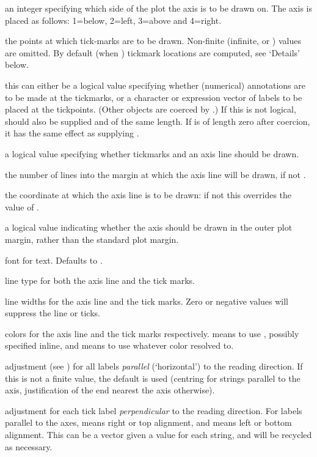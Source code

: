 \begin{Arguments}
\begin{ldescription}
\item[\code{side}] an integer specifying which side of the plot the axis is
to be drawn on.  The axis is placed as follows: 1=below,
2=left, 3=above and 4=right.
\item[\code{at}] the points at which tick-marks are to be drawn.  Non-finite
(infinite,  or ) values are omitted.  By default
(when ) tickmark locations are computed, see
`Details' below.
\item[\code{labels}] this can either be a logical value specifying whether
(numerical) annotations are to be made at the tickmarks, or a
character or expression vector of labels to be placed at the
tickpoints.  (Other objects are coerced by .)
If this is not logical,  should also be supplied and of the
same length.  If  is of length zero after coercion,
it has the same effect as supplying .
\item[\code{tick}] a logical value specifying whether tickmarks and an axis line
should be drawn.
\item[\code{line}] the number of lines into the margin at which the axis line
will be drawn, if not .
\item[\code{pos}] the coordinate at which the axis line is to be drawn:
if not  this overrides the value of .
\item[\code{outer}] a logical value indicating whether the axis should be
drawn in the outer plot margin, rather than the standard plot
margin.
\item[\code{font}] font for text.  Defaults to .
\item[\code{lty}] line type for both the axis line and the tick marks.
\item[\code{lwd, lwd.ticks}] line widths for the axis line and the tick
marks. Zero or negative values will suppress the line or ticks.
\item[\code{col, col.ticks}] colors for the axis line and the tick marks
respectively.   means to use ,
possibly specified inline, and  means to use
whatever color  resolved to.
\item[\code{hadj}] adjustment (see ) for all labels
\emph{parallel} (`horizontal') to the reading direction.  If
this is not a finite value, the default is used (centring for
strings parallel to the axis, justification of the end nearest the
axis otherwise).
\item[\code{padj}] adjustment for each tick label \emph{perpendicular} to the
reading direction.  For labels parallel to the axes, 
means right or top alignment, and  means left or bottom
alignment.  This can be a vector given a value for each string, and
will be recycled as necessary.


\end{ldescription}
\end{Arguments}
